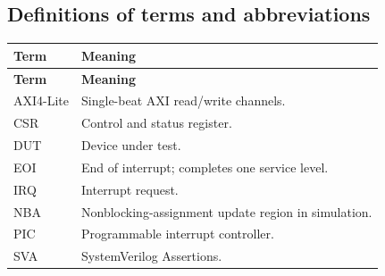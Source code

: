 \documentclass[11pt]{article}
\begin{document}
\subsection{Definitions of terms and abbreviations}
{\small
\begin{longtable}{@{}L{0.2300\dimexpr\linewidth-12pt\relax}L{0.7700\dimexpr\linewidth-12pt\relax}@{}}
\toprule
\textbf{Term} & \textbf{Meaning} \\ \midrule
\endfirsthead
\toprule
\textbf{Term} & \textbf{Meaning} \\ \midrule
\endhead
AXI4-Lite & Single-beat AXI read/write channels. \\ \addlinespace[3pt]
CSR & Control and status register. \\ \addlinespace[3pt]
DUT & Device under test. \\ \addlinespace[3pt]
EOI & End of interrupt; completes one service level. \\ \addlinespace[3pt]
IRQ & Interrupt request. \\ \addlinespace[3pt]
NBA & Nonblocking-assignment update region in simulation. \\ \addlinespace[3pt]
PIC & Programmable interrupt controller. \\ \addlinespace[3pt]
SVA & SystemVerilog Assertions. \\*
\bottomrule\end{longtable}}

\end{document}
